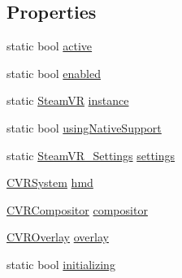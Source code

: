 \subsection*{Properties}
\begin{DoxyCompactItemize}
\item 
static bool \mbox{\hyperlink{class_valve_1_1_v_r_1_1_steam_v_r_ad98d1d8dafb84740b3a005d435da62a5}{active}}
\item 
static bool \mbox{\hyperlink{class_valve_1_1_v_r_1_1_steam_v_r_a01a7ae168e43e04628afa31f6b4334a8}{enabled}}
\item 
static \mbox{\hyperlink{class_valve_1_1_v_r_1_1_steam_v_r}{Steam\+VR}} \mbox{\hyperlink{class_valve_1_1_v_r_1_1_steam_v_r_af374389920329f77814037a571f6bf2f}{instance}}
\item 
static bool \mbox{\hyperlink{class_valve_1_1_v_r_1_1_steam_v_r_ae5409008a8d99e33625353d01cb3461a}{using\+Native\+Support}}
\item 
static \mbox{\hyperlink{class_valve_1_1_v_r_1_1_steam_v_r___settings}{Steam\+V\+R\+\_\+\+Settings}} \mbox{\hyperlink{class_valve_1_1_v_r_1_1_steam_v_r_a8d2a06793f921d45801b50af18f0c413}{settings}}
\item 
\mbox{\hyperlink{class_valve_1_1_v_r_1_1_c_v_r_system}{C\+V\+R\+System}} \mbox{\hyperlink{class_valve_1_1_v_r_1_1_steam_v_r_ac39286e713a282760df8619b882d62ea}{hmd}}
\item 
\mbox{\hyperlink{class_valve_1_1_v_r_1_1_c_v_r_compositor}{C\+V\+R\+Compositor}} \mbox{\hyperlink{class_valve_1_1_v_r_1_1_steam_v_r_a86bfdab460046b7ed13adbea400b31a4}{compositor}}
\item 
\mbox{\hyperlink{class_valve_1_1_v_r_1_1_c_v_r_overlay}{C\+V\+R\+Overlay}} \mbox{\hyperlink{class_valve_1_1_v_r_1_1_steam_v_r_a18a7c3184731127a2f61881101c98fd4}{overlay}}
\item 
static bool \mbox{\hyperlink{class_valve_1_1_v_r_1_1_steam_v_r_acde154731d95b91617b4c36f1ff79eda}{initializing}}

\end{DoxyCompactItemize}
